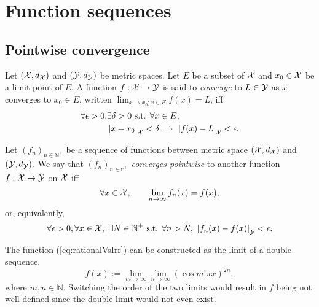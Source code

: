 \section{Function sequences}
\label{sec:uniform-convergence}

\subsection{Pointwise convergence}

\begin{defn}
  \label{def:limitingValueOfAfunc}
  Let $({\cal X}, d_{{\cal X}})$
   and $({\cal Y}, d_{{\cal Y}})$ be metric spaces.
  Let $E$ be a subset of ${\cal X}$
   and $x_0\in {\cal X}$ be a limit point of $E$.
  A function $f:{\cal X}\rightarrow {\cal Y}$
   is said to \emph{converge} to $L\in {\cal Y}$
   as $x$ converges to $x_0\in E$,
   written
     $\lim_{x\rightarrow x_0; x\in E} f(x) = L$,
   iff
   \begin{align}
     \nonumber
     \forall \epsilon>0, &\exists \delta>0 \text{ s.t. }
     \forall x\in E,\ 
     \\      \label{eq:limitingValueOfAfuncCond}
     &\left|x-x_0\right|_{{\cal X}} < \delta
      \ \Rightarrow\ 
     \left|f(x)- L\right|_{{\cal Y}} < \epsilon.
   \end{align}
\end{defn}


\begin{defn}
  \label{def:pointwiseConvergence}
  Let $(f_n)_{n\in\mathbb{N}^+}$ be a sequence of functions
   between metric space $({\cal X}, d_{{\cal X}})$
   and $({\cal Y}, d_{{\cal Y}})$.
  We say that $(f_n)_{n\in\mathbb{n}^+}$ \emph{converges pointwise}
   to another function $f:{\cal X}\rightarrow{\cal Y}$ on ${\cal X}$ iff
   \begin{equation}
     \label{eq:pointwiseConvergence1}
     \forall x\in {\cal X},\qquad
     \lim_{n\rightarrow \infty} f_n(x) =  f(x),
   \end{equation}
   or, equivalently, 
   \begin{equation}
     \label{eq:pointwiseConvergence2}
     \forall \epsilon>0, 
      \forall x\in {\cal X},\ 
       \exists N\in \mathbb{N}^+ \text{ s.t. } \forall n>N,\ 
       \left|f_n(x)- f(x)\right|_{{\cal Y}} < \epsilon.
   \end{equation}
\end{defn}

\begin{exm}
  The function (\ref{eq:rationalVsIrr}) can be constructed
  as the limit of a double sequence, 
  \begin{equation}
    \label{eq:construcRatVsIrrat}
    f(x) := \lim_{m\rightarrow \infty} \lim_{n\rightarrow \infty}
    (\cos m!\pi x)^{2n}, 
  \end{equation}
  where $m,n\in \mathbb{N}$.
  Switching the order of the two limits 
  would result in $f$ being not well defined
  since the double limit would not even exist.
\end{exm}

